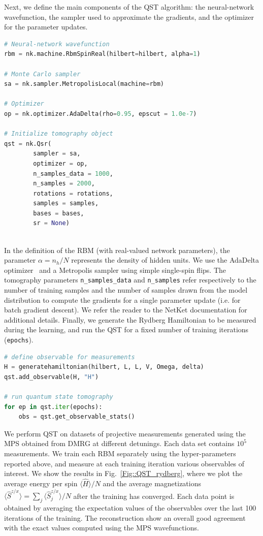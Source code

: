 \documentclass[twocolumn,english,reprint,superscriptaddress,longbibliography,pra]{revtex4-1}
\begin{document}
Next, we define the main components of the QST algorithm: the neural-network wavefunction, the sampler used to approximate the gradients, and the optimizer for the parameter updates. 
\begin{lstlisting}[language=Python,numbers=none]
# Neural-network wavefunction
rbm = nk.machine.RbmSpinReal(hilbert=hilbert, alpha=1)

# Monte Carlo sampler
sa = nk.sampler.MetropolisLocal(machine=rbm)

# Optimizer
op = nk.optimizer.AdaDelta(rho=0.95, epscut = 1.0e-7)

# Initialize tomography object
qst = nk.Qsr(
        sampler = sa,
        optimizer = op,
        n_samples_data = 1000,
        n_samples = 2000,
        rotations = rotations,
        samples = samples,
        bases = bases,
        sr = None)
        
\end{lstlisting}
In the definition of the RBM (with real-valued network parameters), the parameter $\alpha = n_h/N$ represents the density of hidden units. We use the AdaDelta optimizer~\cite{2012arXiv1212.5701Z} and a Metropolis sampler using simple single-spin flips. The tomography parameters \texttt{n\_samples\_data} and \texttt{n\_samples} refer respectively to the number of training samples and the number of samples drawn from the model distribution to compute the gradients for a single parameter update (i.e. for batch gradient descent). We refer the reader to the NetKet documentation for additional details. Finally, we generate the Rydberg Hamiltonian to be measured during the learning, and run the QST for a fixed number of training iterations (\texttt{epochs}).
\begin{lstlisting}[language=Python,numbers=none]
# define observable for measurements
H = generatehamiltonian(hilbert, L, L, V, Omega, delta)
qst.add_observable(H, "H")

# run quantum state tomography
for ep in qst.iter(epochs):
    obs = qst.get_observable_stats()
\end{lstlisting}

We perform QST on datasets of projective measurements generated using the MPS obtained from DMRG at different detunings. Each data set contains $10^5$ measurements. We train each RBM separately using the hyper-parameters reported above, and measure at each training iteration various observables of interest. We show the results in Fig.~\ref{Fig::QST_rydberg}, where we plot the average energy per spin $\langle\hat{H}\rangle/N$ and the average magnetizations $\langle\hat{S}^{z/x}\rangle = \sum_j\langle\hat{S}_j^{z/x}\rangle/N$ after the training has converged. Each data point is obtained by averaging the expectation values of the observables over the last 100 iterations of the training. The reconstruction show an overall good agreement with the exact values computed using the MPS wavefunctions.
\end{document}

